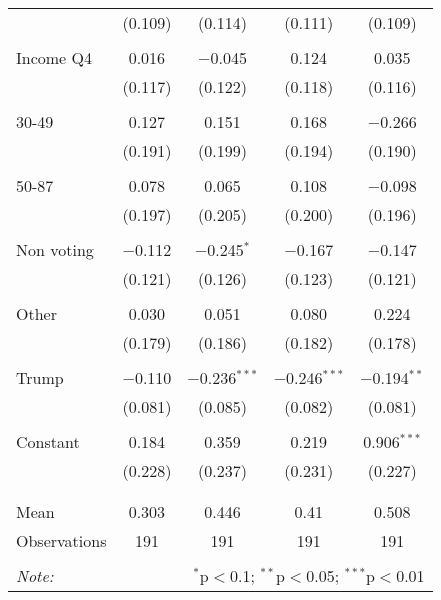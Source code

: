 \begin{tabular}{@{\extracolsep{5pt}}lcccc}
  & (0.109) & (0.114) & (0.111) & (0.109) \\ 
  & & & & \\ 
 Income Q4 & 0.016 & $-$0.045 & 0.124 & 0.035 \\ 
  & (0.117) & (0.122) & (0.118) & (0.116) \\ 
  & & & & \\ 
 30-49 & 0.127 & 0.151 & 0.168 & $-$0.266 \\ 
  & (0.191) & (0.199) & (0.194) & (0.190) \\ 
  & & & & \\ 
 50-87 & 0.078 & 0.065 & 0.108 & $-$0.098 \\ 
  & (0.197) & (0.205) & (0.200) & (0.196) \\ 
  & & & & \\ 
 Non voting & $-$0.112 & $-$0.245$^{*}$ & $-$0.167 & $-$0.147 \\ 
  & (0.121) & (0.126) & (0.123) & (0.121) \\ 
  & & & & \\ 
 Other & 0.030 & 0.051 & 0.080 & 0.224 \\ 
  & (0.179) & (0.186) & (0.182) & (0.178) \\ 
  & & & & \\ 
 Trump & $-$0.110 & $-$0.236$^{***}$ & $-$0.246$^{***}$ & $-$0.194$^{**}$ \\ 
  & (0.081) & (0.085) & (0.082) & (0.081) \\ 
  & & & & \\ 
 Constant & 0.184 & 0.359 & 0.219 & 0.906$^{***}$ \\ 
  & (0.228) & (0.237) & (0.231) & (0.227) \\ 
  & & & & \\ 
\hline \\[-1.8ex] 
Mean & 0.303 & 0.446 & 0.41 & 0.508 \\ 
Observations & 191 & 191 & 191 & 191 \\ 
\hline 
\hline \\[-1.8ex] 
\textit{Note:}  & \multicolumn{4}{r}{$^{*}$p$<$0.1; $^{**}$p$<$0.05; $^{***}$p$<$0.01} \\ 
\end{tabular} 
